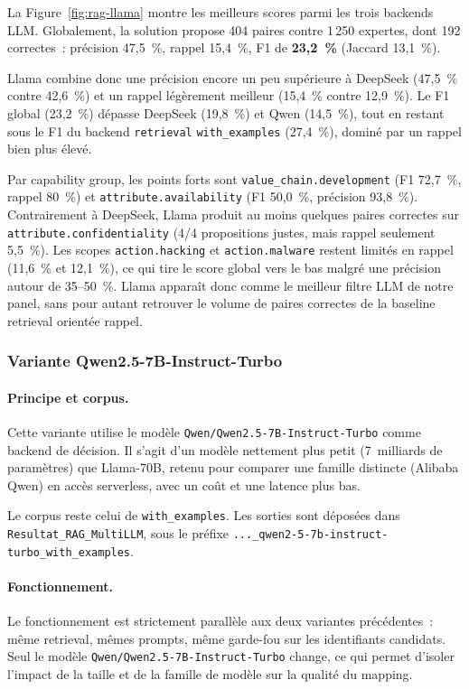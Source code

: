 \documentclass[a4paper,12pt]{article}
\begin{document}
La Figure~\ref{fig:rag-llama} montre les meilleurs scores parmi
les trois backends LLM. Globalement, la solution propose 404 paires
contre 1\,250 expertes, dont 192 correctes~: précision 47,5~\%,
rappel 15,4~\%, F1 de \textbf{23,2~\%} (Jaccard 13,1~\%).

Llama combine donc une précision encore un peu supérieure à
DeepSeek (47,5~\% contre 42,6~\%) et un rappel légèrement meilleur
(15,4~\% contre 12,9~\%). Le F1 global (23,2~\%) dépasse DeepSeek
(19,8~\%) et Qwen (14,5~\%), tout en restant sous le F1 du backend
\texttt{retrieval} \texttt{with\_examples} (27,4~\%), dominé par un
rappel bien plus élevé.

Par capability group, les points forts sont
\texttt{value\_chain.development} (F1 72,7~\%, rappel 80~\%) et
\texttt{attribute.availability} (F1 50,0~\%, précision 93,8~\%).
Contrairement à DeepSeek, Llama produit au moins quelques paires
correctes sur \texttt{attribute.confidentiality} (4/4 propositions
justes, mais rappel seulement 5,5~\%). Les scopes
\texttt{action.hacking} et \texttt{action.malware} restent limités
en rappel (11,6~\% et 12,1~\%), ce qui tire le score global vers le
bas malgré une précision autour de 35--50~\%. Llama apparaît donc
comme le meilleur filtre LLM de notre panel, sans pour autant
retrouver le volume de paires correctes de la baseline retrieval
orientée rappel.

\subsubsection{Variante Qwen2.5-7B-Instruct-Turbo}

\paragraph{Principe et corpus.}
Cette variante utilise le modèle
\texttt{Qwen/Qwen2.5-7B-Instruct-Turbo} comme backend de décision.
Il s'agit d'un modèle nettement plus petit (7~milliards de
paramètres) que Llama-70B, retenu pour comparer une famille
distincte (Alibaba Qwen) en accès serverless, avec un coût et une
latence plus bas.

Le corpus reste celui de \texttt{with\_examples}. Les
sorties sont déposées dans \texttt{Resultat\_RAG\_MultiLLM}, sous
le préfixe \texttt{...\_qwen2-5-7b-instruct-turbo\_with\_examples}.
      
\paragraph{Fonctionnement.}
Le fonctionnement est strictement parallèle aux deux variantes
précédentes~: même retrieval, mêmes prompts, même garde-fou sur les
identifiants candidats. Seul le modèle
\texttt{Qwen/Qwen2.5-7B-Instruct-Turbo} change, ce qui permet
d'isoler l'impact de la taille et de la famille de modèle sur la
qualité du mapping.
\end{document}
